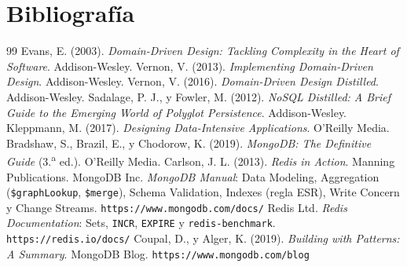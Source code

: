 \documentclass[11pt,a4paper]{article}
\begin{document}
	\section{Bibliografía}
	\begingroup
	\renewcommand{\section}[2]{}
	\begin{thebibliography}{99}
		 Evans, E. (2003). \textit{Domain-Driven Design: Tackling Complexity in the Heart of Software}. Addison-Wesley.
		 Vernon, V. (2013). \textit{Implementing Domain-Driven Design}. Addison-Wesley.
		 Vernon, V. (2016). \textit{Domain-Driven Design Distilled}. Addison-Wesley.
		 Sadalage, P. J., y Fowler, M. (2012). \textit{NoSQL Distilled: A Brief Guide to the Emerging World of Polyglot Persistence}. Addison-Wesley.
		 Kleppmann, M. (2017). \textit{Designing Data-Intensive Applications}. O'Reilly Media.
		 Bradshaw, S., Brazil, E., y Chodorow, K. (2019). \textit{MongoDB: The Definitive Guide} (3.\textsuperscript{a} ed.). O'Reilly Media.
		 Carlson, J. L. (2013). \textit{Redis in Action}. Manning Publications.
		 MongoDB Inc. \textit{MongoDB Manual}: Data Modeling, Aggregation (\texttt{\$graphLookup}, \texttt{\$merge}), Schema Validation, Indexes (regla ESR), Write Concern y Change Streams. \texttt{https://www.mongodb.com/docs/}
		 Redis Ltd. \textit{Redis Documentation}: Sets, \texttt{INCR}, \texttt{EXPIRE} y \texttt{redis-benchmark}. \texttt{https://redis.io/docs/}
		 Coupal, D., y Alger, K. (2019). \textit{Building with Patterns: A Summary}. MongoDB Blog. \texttt{https://www.mongodb.com/blog}
	\end{thebibliography}
	\endgroup
	
\end{document}
